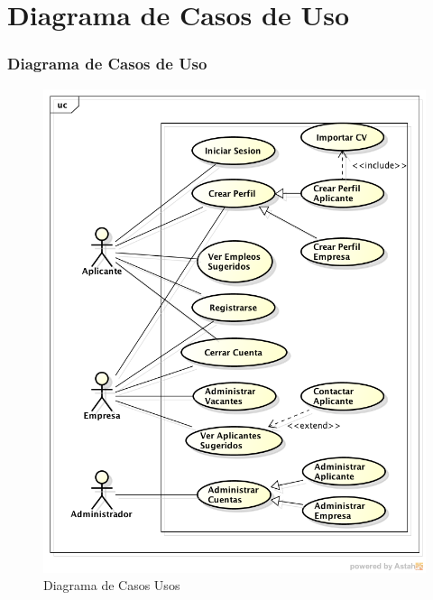 \section{Diagrama de Casos de Uso}
\frame
{
  \frametitle{Diagrama de Casos de Uso}
  
\begin{figure}[h]
\begin{center}
	\includegraphics[scale=0.3]{./resources/Modelo_de_Caosos_de_Uso.png}
	\caption{Diagrama de Casos Usos}
	\label{fig:usercasediagram}
\end{center}
\end{figure}

}